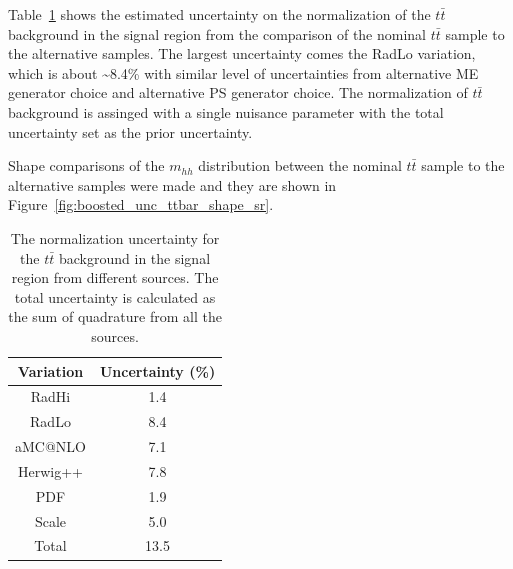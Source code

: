 Table~\ref{tab:boosted_unc_ttbar} shows the estimated uncertainty on the normalization of the $t\bar{t}$ background in the signal region
from the comparison of the nominal $t\bar{t}$ sample to the alternative samples. The largest uncertainty comes the RadLo variation,
which is about \textasciitilde8.4\% with similar level of uncertainties from alternative ME generator choice and alternative PS generator choice.
The normalization of $t\bar{t}$ background is assinged with a single nuisance parameter with the total uncertainty set as the prior uncertainty.
 
Shape comparisons of the $m_{hh}$ distribution between the nominal $t\bar{t}$ sample to the alternative samples were made and they are shown in
Figure~\ref{fig:boosted_unc_ttbar_shape_sr}. %
 
\begin{table}[htbp!]
\begin{center}
\begin{tabular}{c|c}
Variation  &  Uncertainty (\%) \\
\hline
RadHi      &                 1.4 \\
RadLo      &                 8.4 \\
aMC@NLO    &                 7.1 \\
Herwig++   &                 7.8 \\
PDF        &                 1.9 \\
Scale      &                 5.0 \\
\hline
Total      &                13.5 \\
\end{tabular}
\end{center}
\caption{The normalization uncertainty for the $t\bar{t}$ background in the signal region
from different sources. The total uncertainty is calculated as the sum of quadrature from all
the sources.}
\label{tab:boosted_unc_ttbar}
\end{table}
 
